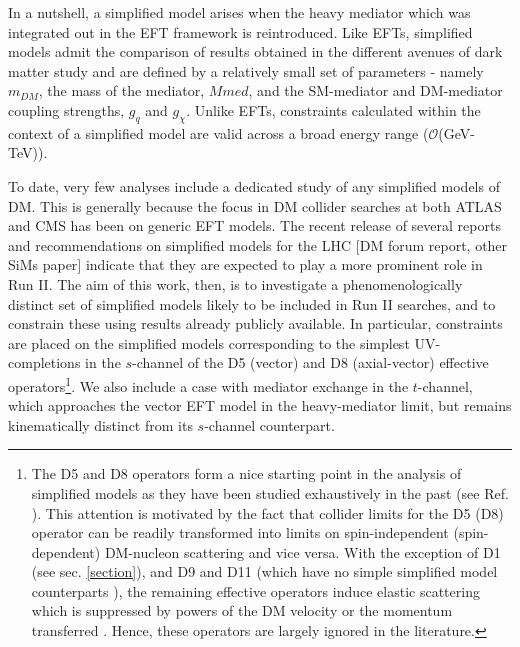 In a nutshell, a simplified model arises when the heavy mediator which was integrated out in the EFT framework is reintroduced. Like EFTs, simplified models admit the comparison of results obtained in the different avenues of dark matter study \cite{} and are defined by a relatively small set of parameters - namely $m_{DM}$, the mass of the mediator, $Mmed$, and the SM-mediator and DM-mediator coupling strengths, $g_{q}$ and $g_\chi$. Unlike EFTs, constraints calculated within the context of a simplified model are valid across a broad energy range ($\mathcal{O}$(GeV-TeV)).

To date, very few analyses include a dedicated study of any simplified models of DM. This is generally because the focus in DM collider searches at both ATLAS and CMS has been on generic EFT models. The recent release of several reports and recommendations on simplified models for the LHC $[$DM forum report, other SiMs paper$]$ indicate that they are expected to play a more prominent role in Run II. The aim of this work, then, is to investigate a phenomenologically distinct set of simplified models likely to be included in Run II searches, and to constrain these using results already publicly available. In particular, constraints are placed on the simplified models corresponding to the simplest UV-completions in the $s$-channel of the D5 (vector) and D8 (axial-vector) effective operators\footnote{The D5 and D8 operators form a nice starting point in the analysis of simplified models as they have been studied exhaustively in the past (see Ref. \cite{}). This attention is motivated by the fact that collider limits for the D5 (D8) operator can be readily transformed into limits on spin-independent (spin-dependent) DM-nucleon scattering and vice versa. With the exception of D1 (see sec. \ref{section}), and D9 and D11 (which have no simple simplified model counterparts \cite{}), the remaining effective operators induce elastic scattering which is suppressed by powers of the DM velocity or the momentum transferred \cite{Kumar}. Hence, these operators are largely ignored in the literature.}. We also include a case with mediator exchange in the $t$-channel, which approaches the vector EFT model in the heavy-mediator limit, but remains kinematically distinct from its $s$-channel counterpart.

